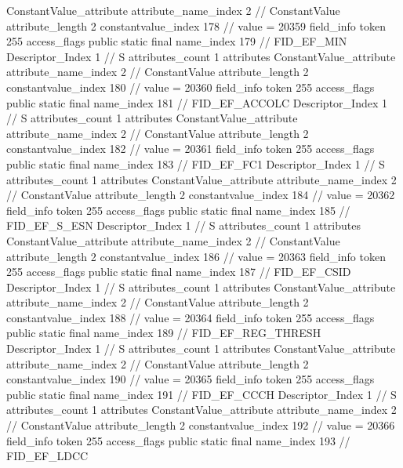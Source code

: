 {{{{{{				ConstantValue_attribute {
					attribute_name_index	2		// ConstantValue
					attribute_length	2
					constantvalue_index	178		// value = 20359
				}
				}
			}
			field_info {
				token	255
				access_flags	public static final
				name_index	179		// FID_EF_MIN
				Descriptor_Index	1		// S
				attributes_count	1
				attributes {
				ConstantValue_attribute {
					attribute_name_index	2		// ConstantValue
					attribute_length	2
					constantvalue_index	180		// value = 20360
				}
				}
			}
			field_info {
				token	255
				access_flags	public static final
				name_index	181		// FID_EF_ACCOLC
				Descriptor_Index	1		// S
				attributes_count	1
				attributes {
				ConstantValue_attribute {
					attribute_name_index	2		// ConstantValue
					attribute_length	2
					constantvalue_index	182		// value = 20361
				}
				}
			}
			field_info {
				token	255
				access_flags	public static final
				name_index	183		// FID_EF_FC1
				Descriptor_Index	1		// S
				attributes_count	1
				attributes {
				ConstantValue_attribute {
					attribute_name_index	2		// ConstantValue
					attribute_length	2
					constantvalue_index	184		// value = 20362
				}
				}
			}
			field_info {
				token	255
				access_flags	public static final
				name_index	185		// FID_EF_S_ESN
				Descriptor_Index	1		// S
				attributes_count	1
				attributes {
				ConstantValue_attribute {
					attribute_name_index	2		// ConstantValue
					attribute_length	2
					constantvalue_index	186		// value = 20363
				}
				}
			}
			field_info {
				token	255
				access_flags	public static final
				name_index	187		// FID_EF_CSID
				Descriptor_Index	1		// S
				attributes_count	1
				attributes {
				ConstantValue_attribute {
					attribute_name_index	2		// ConstantValue
					attribute_length	2
					constantvalue_index	188		// value = 20364
				}
				}
			}
			field_info {
				token	255
				access_flags	public static final
				name_index	189		// FID_EF_REG_THRESH
				Descriptor_Index	1		// S
				attributes_count	1
				attributes {
				ConstantValue_attribute {
					attribute_name_index	2		// ConstantValue
					attribute_length	2
					constantvalue_index	190		// value = 20365
				}
				}
			}
			field_info {
				token	255
				access_flags	public static final
				name_index	191		// FID_EF_CCCH
				Descriptor_Index	1		// S
				attributes_count	1
				attributes {
				ConstantValue_attribute {
					attribute_name_index	2		// ConstantValue
					attribute_length	2
					constantvalue_index	192		// value = 20366
				}
				}
			}
			field_info {
				token	255
				access_flags	public static final
				name_index	193		// FID_EF_LDCC
}}}}}
